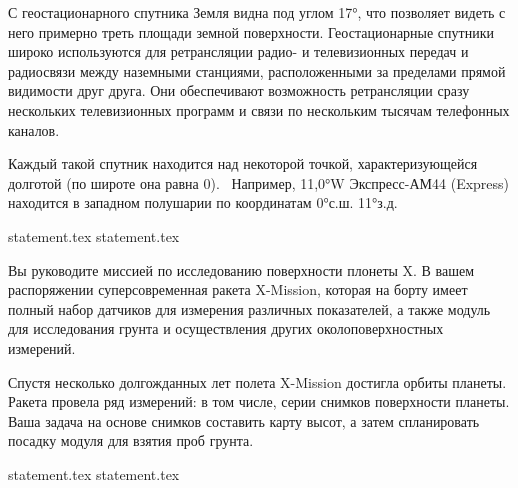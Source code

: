 С геостационарного спутника Земля видна под углом 17°, что позволяет видеть с него примерно треть площади земной поверхности. Геостационарные спутники широко используются для ретрансляции радио- и телевизионных передач и радиосвязи между наземными станциями, расположенными за пределами прямой видимости друг друга. Они обеспечивают возможность ретрансляции сразу нескольких телевизионных программ и связи по нескольким тысячам телефонных каналов.

Каждый такой спутник находится над некоторой точкой, характеризующейся долготой (по широте она равна 0). 
Например, 11,0°W Экспресс-АМ44 (Express) находится в западном полушарии по координатам 0°с.ш. 11°з.д.

{statement.tex}
{statement.tex}

Вы руководите миссией по исследованию поверхности плонеты X. В вашем распоряжении суперсовременная ракета X-Mission, которая на борту имеет полный набор датчиков для измерения различных показателей, а также модуль для исследования грунта и осуществления других околоповерхностных измерений.

Спустя несколько долгожданных лет полета X-Mission достигла орбиты планеты. Ракета провела ряд измерений: в том числе, серии снимков поверхности планеты. Ваша задача на основе снимков составить карту высот, а затем спланировать посадку модуля для взятия проб грунта. 

{statement.tex}
{statement.tex}